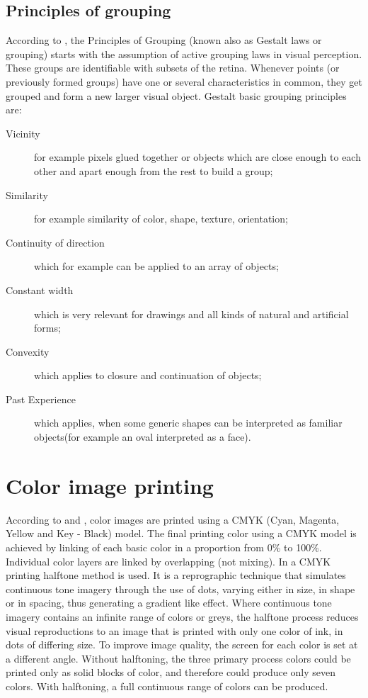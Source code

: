 \documentclass[a4paper,onecolumn,oneside,12pt]{memoir}
\begin{document}
\subsection{Principles of grouping}

According to \cite{gestaltTheory}, the Principles of Grouping (known also as Gestalt laws or
grouping) starts with the assumption of active grouping laws in visual perception. These groups are
identifiable with subsets of the retina. Whenever points (or previously formed groups) have one or
several characteristics in common, they get grouped and form a new larger visual object. Gestalt
basic grouping principles are:

\begin{description}
  \item[Vicinity] for example pixels glued together or objects which are close enough to each other
        and apart enough from the rest to build a group;
  \item[Similarity] for example similarity of color, shape, texture, orientation;
  \item[Continuity of direction] which for example can be applied to an array of objects;
  \item[Constant width] which is very relevant for drawings and all kinds of natural and artificial
        forms;
  \item[Convexity] which applies to closure and continuation of objects;
  \item[Past Experience] which applies, when some generic shapes can be interpreted as familiar
        objects(for example an oval interpreted as a face).
\end{description}

\section{Color image printing}

According to \cite{cmykWiki} and \cite{halftoneWiki}, color images are printed using a CMYK (Cyan,
Magenta, Yellow and Key - Black) model. The final printing color using a CMYK model is achieved by
linking of each basic color in a proportion from 0\% to 100\%. Individual color layers are linked by 
overlapping (not mixing). In a CMYK printing halftone method is used. It is a reprographic technique
that simulates continuous tone imagery through the use of dots, varying either in size, in shape or
in spacing, thus generating a gradient like effect. Where continuous tone imagery contains an
infinite range of colors or greys, the halftone process reduces visual reproductions to an image
that is printed with only one color of ink, in dots of differing size. To improve image quality, the
screen for each color is set at a different angle. Without halftoning, the three primary process
colors could be printed only as solid blocks of color, and therefore could produce only seven
colors. With halftoning, a full continuous range of colors can be produced.
\end{document}
